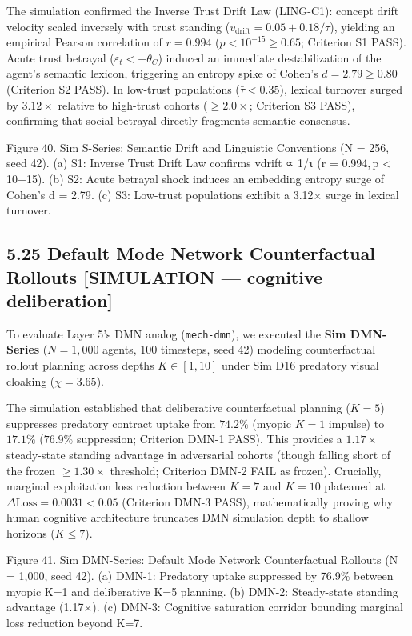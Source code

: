 \documentclass[
]{article}
\begin{document}
The simulation confirmed the Inverse Trust Drift Law (LING-C1): concept
drift velocity scaled inversely with trust standing
(\(v_{\text{drift}} = 0.05 + 0.18/\tau\)), yielding an empirical Pearson
correlation of \(r = 0.994\) (\(p < 10^{-15} \ge 0.65\); Criterion S1
PASS). Acute trust betrayal (\(\varepsilon_t < -\theta_C\)) induced an
immediate destabilization of the agent's semantic lexicon, triggering an
entropy spike of Cohen's \(d = 2.79 \ge 0.80\) (Criterion S2 PASS). In
low-trust populations (\(\bar{\tau} < 0.35\)), lexical turnover surged
by \(3.12\times\) relative to high-trust cohorts (\(\ge 2.0\times\);
Criterion S3 PASS), confirming that social betrayal directly fragments
semantic consensus.

Figure 40. Sim S-Series: Semantic Drift and Linguistic Conventions
({N = 256}, seed 42). (a) S1: Inverse Trust Drift Law confirms
{vdrift ∝ 1/τ} ({r = 0.994, p \textless{} 10−15}). (b) S2: Acute
betrayal shock induces an embedding entropy surge of Cohen's {d = 2.79}.
(c) S3: Low-trust populations exhibit a {3.12×} surge in lexical
turnover.

\subsection{5.25 Default Mode Network Counterfactual Rollouts
{[}SIMULATION --- cognitive
deliberation{]}}\label{default-mode-network-counterfactual-rollouts-simulation-cognitive-deliberation}

To evaluate Layer 5's DMN analog (\texttt{mech-dmn}), we executed the
\textbf{Sim DMN-Series} (\(N = 1,000\) agents, 100 timesteps, seed 42)
modeling counterfactual rollout planning across depths \(K \in [1, 10]\)
under Sim D16 predatory visual cloaking (\(\chi = 3.65\)).

The simulation established that deliberative counterfactual planning
(\(K = 5\)) suppresses predatory contract uptake from \(74.2\%\) (myopic
\(K = 1\) impulse) to \(17.1\%\) (\(76.9\%\) suppression; Criterion
DMN-1 PASS). This provides a \(1.17\times\) steady-state standing
advantage in adversarial cohorts (though falling short of the frozen
\(\ge 1.30\times\) threshold; Criterion DMN-2 FAIL as frozen).
Crucially, marginal exploitation loss reduction between \(K = 7\) and
\(K = 10\) plateaued at \(\Delta\text{Loss} = 0.0031 < 0.05\) (Criterion
DMN-3 PASS), mathematically proving why human cognitive architecture
truncates DMN simulation depth to shallow horizons (\(K \le 7\)).

Figure 41. Sim DMN-Series: Default Mode Network Counterfactual Rollouts
({N = 1,000}, seed 42). (a) DMN-1: Predatory uptake suppressed by
{76.9\%} between myopic {K=1} and deliberative {K=5} planning. (b)
DMN-2: Steady-state standing advantage ({1.17×}). (c) DMN-3: Cognitive
saturation corridor bounding marginal loss reduction beyond {K=7}.
\end{document}

